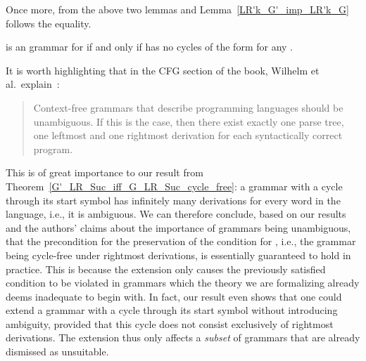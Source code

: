 \begin{isabellebody}
\begin{isamarkuptext}
Once more, from the above two lemmas and Lemma~\ref{LR'k_G'_imp_LR'k_G} follows the equality.

\begin{theorem}\label{G'_LR_Suc_iff_G_LR_Suc_cycle_free}
 is an  grammar for  if and only if  has no cycles of the form 
 for any .
\end{theorem}

It is worth highlighting that in the CFG section of the book, Wilhelm et al.\
explain~\cite[p. 52]{Wilhelm}:
\begin{quote}
Context-free grammars that describe programming languages should be unambiguous. If this is the case, 
then there exist exactly one parse tree, one leftmost and one rightmost derivation for each 
syntactically correct program.
\end{quote}

This is of great importance to our result from Theorem~\ref{G'_LR_Suc_iff_G_LR_Suc_cycle_free}: a 
grammar with a cycle through its start symbol has infinitely many derivations for every word in the
language, i.e., it is ambiguous. We can therefore conclude, based on our results and the authors'
claims about the importance of grammars being unambiguous, that the precondition for the preservation
of the \isa{LR{\isacharparenleft}{\kern0pt}k{\isacharparenright}{\kern0pt}} condition for , i.e., the grammar being cycle-free under rightmost derivations, 
is essentially guaranteed to hold in practice. This is because the extension only causes the 
previously satisfied condition to be violated in grammars which the theory we are formalizing 
already deems inadequate to begin with. In fact, our result even shows that one could extend a
grammar with a cycle through its start symbol without introducing ambiguity, provided that this cycle
does not consist exclusively of rightmost derivations. The extension thus only affects a \emph{subset}
of grammars that are already dismissed as unsuitable.


\end{isamarkuptext}
\end{isabellebody}
